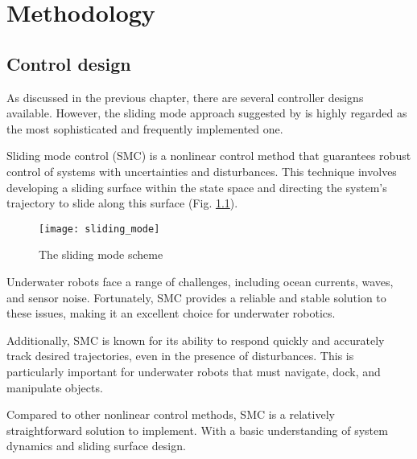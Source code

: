 \chapter{Methodology}
\label{chap:ctrl}





\section{Control design}



As discussed in the previous chapter, there are several controller 
designs available. However, the sliding mode approach suggested by 
is highly regarded as the most sophisticated and frequently implemented one. 

Sliding mode control (SMC) is a nonlinear control method that guarantees 
robust control of systems with uncertainties and disturbances. 
This technique involves developing a sliding surface within the state 
space and directing the system's trajectory to slide along this surface (Fig. \ref{image:sliding_mode}).

\begin{figure}[H]
    \centering\texttt{[image: sliding\_mode]}
    \caption{The sliding mode scheme}
    \label{image:sliding_mode}
\end{figure}


Underwater robots face a range of challenges, including ocean currents, waves, 
and sensor noise. Fortunately, SMC provides a reliable and 
stable solution to these issues, making it an excellent choice for underwater 
robotics.

Additionally, SMC is known for its ability to respond quickly and accurately track desired 
trajectories, even in the presence of disturbances. This is particularly important 
for underwater robots that must navigate, dock, and manipulate objects.

Compared to other nonlinear control methods, SMC is a relatively straightforward 
solution to implement. With a basic understanding of system dynamics and sliding 
surface design.

